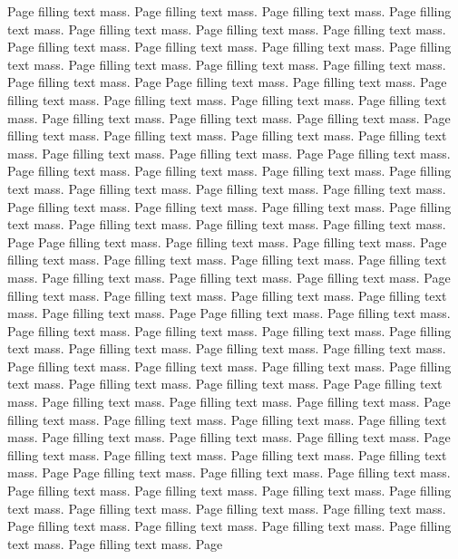 \documentclass[12pt,a4paper,twoside,openright]{book}
\begin{document}
Page filling text mass. Page filling text mass. Page filling text mass. Page
filling text mass. Page filling text mass. Page filling text mass. Page
filling text mass. Page filling text mass. Page filling text mass. Page
filling text mass. Page filling text mass. Page filling text mass. Page
filling text mass. Page filling text mass. Page filling text mass. Page
Page filling text mass. Page filling text mass. Page filling text mass. Page
filling text mass. Page filling text mass. Page filling text mass. Page
filling text mass. Page filling text mass. Page filling text mass. Page
filling text mass. Page filling text mass. Page filling text mass. Page
filling text mass. Page filling text mass. Page filling text mass. Page
Page filling text mass. Page filling text mass. Page filling text mass. Page
filling text mass. Page filling text mass. Page filling text mass. Page
filling text mass. Page filling text mass. Page filling text mass. Page
filling text mass. Page filling text mass. Page filling text mass. Page
filling text mass. Page filling text mass. Page filling text mass. Page
Page filling text mass. Page filling text mass. Page filling text mass. Page
filling text mass. Page filling text mass. Page filling text mass. Page
filling text mass. Page filling text mass. Page filling text mass. Page
filling text mass. Page filling text mass. Page filling text mass. Page
filling text mass. Page filling text mass. Page filling text mass. Page
Page filling text mass. Page filling text mass. Page filling text mass. Page
filling text mass. Page filling text mass. Page filling text mass. Page
filling text mass. Page filling text mass. Page filling text mass. Page
filling text mass. Page filling text mass. Page filling text mass. Page
filling text mass. Page filling text mass. Page filling text mass. Page
Page filling text mass. Page filling text mass. Page filling text mass. Page
filling text mass. Page filling text mass. Page filling text mass. Page
filling text mass. Page filling text mass. Page filling text mass. Page
filling text mass. Page filling text mass. Page filling text mass. Page
filling text mass. Page filling text mass. Page filling text mass. Page
Page filling text mass. Page filling text mass. Page filling text mass. Page
filling text mass. Page filling text mass. Page filling text mass. Page
filling text mass. Page filling text mass. Page filling text mass. Page
filling text mass. Page filling text mass. Page filling text mass. Page
filling text mass. Page filling text mass. Page filling text mass. Page

\lstset{basicstyle=\tiny\ttfamily, tabsize=1, frame=single}
\end{document}
